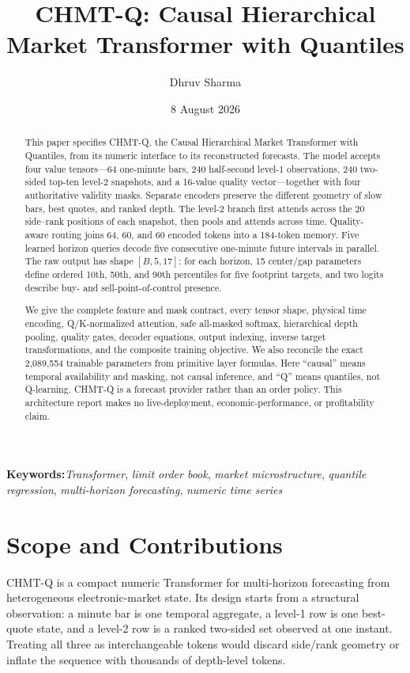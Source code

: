 \documentclass[10pt,letterpaper]{article}
\title{\textbf{CHMT-Q: Causal Hierarchical Market Transformer with Quantiles}}
\author[1]{Dhruv Sharma}
\affil[1]{Independent Researcher\\\texttt{dhruvsha.info@gmail.com}}
\date{8 August 2026}
\numberwithin{equation}{section}
\newcommand{\keywords}[1]{\par\addvspace{\baselineskip}\noindent\textbf{Keywords:}\enspace#1}
\theoremstyle{definition}
\theoremstyle{remark}
\begin{document}
\maketitle
\thispagestyle{fancy}

\begin{abstract}
This paper specifies CHMT-Q, the Causal Hierarchical Market Transformer with
Quantiles, from its numeric interface to its reconstructed forecasts. The model
accepts four value tensors---64 one-minute bars, 240 half-second level-1
observations, 240 two-sided top-ten level-2 snapshots, and a 16-value quality
vector---together with four authoritative validity masks. Separate encoders
preserve the different geometry of slow bars, best quotes, and ranked depth.
The level-2 branch first attends across the 20 side--rank positions of each
snapshot, then pools and attends across time. Quality-aware routing joins 64,
60, and 60 encoded tokens into a 184-token memory. Five learned horizon queries
decode five consecutive one-minute future intervals in parallel. The raw output
has shape $[B,5,17]$: for each horizon, 15 center/gap parameters define ordered
10th, 50th, and 90th percentiles for five footprint targets, and two logits
describe buy- and sell-point-of-control presence.

We give the complete feature and mask contract, every tensor shape, physical
time encoding, Q/K-normalized attention, safe all-masked softmax, hierarchical
depth pooling, quality gates, decoder equations, output indexing, inverse target
transformations, and the composite training objective. We also reconcile the
exact 2,089,554 trainable parameters from primitive layer formulas. Here
``causal'' means temporal availability and masking, not causal inference, and
``Q'' means quantiles, not Q-learning. CHMT-Q is a forecast provider rather
than an order policy. This architecture report makes no live-deployment,
economic-performance, or profitability claim.
\end{abstract}

\keywords{\emph{Transformer}, \emph{limit order book},
\emph{market microstructure}, \emph{quantile regression},
\emph{multi-horizon forecasting}, \emph{numeric time series}}

\section{Scope and Contributions}

CHMT-Q is a compact numeric Transformer for multi-horizon forecasting from
heterogeneous electronic-market state. Its design starts from a structural
observation: a minute bar is one temporal aggregate, a level-1 row is one
best-quote state, and a level-2 row is a ranked two-sided set observed at one
instant. Treating all three as interchangeable tokens would discard side/rank
geometry or inflate the sequence with thousands of depth-level tokens.
\end{document}
